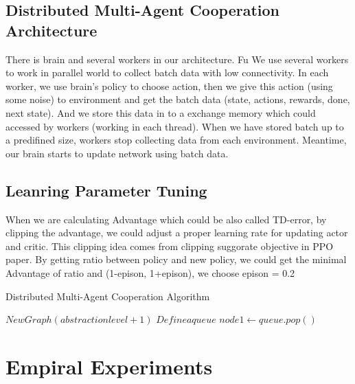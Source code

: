 \documentclass[11pt,twocolumn]{jarticle} %
\begin{document}
\subsection{Distributed Multi-Agent Cooperation Architecture}
There is brain and several workers in our architecture. Fu We use several workers to work in parallel world to collect batch data with low connectivity. In each worker,  we use brain's policy to choose action, then we give this action (using some noise) to environment and get the batch data (state, actions, rewards, done, next state). And we store this data in to a exchange memory which could accessed by workers (working in each thread). When we have stored batch up to a predifined size, workers stop collecting data from each environment. Meantime, our brain starts to update network using batch data.
\subsection{Leanring Parameter Tuning}
When we are calculating Advantage which could be also called TD-error, by clipping the advantage, we could adjust a proper learning rate for updating actor and critic. This clipping idea comes from clipping suggorate objective in PPO paper. By getting ratio between policy and new policy, we could get the minimal Advantage of ratio and (1-epison, 1+epison), we choose epison = 0.2

\begin{algorithm*}
\caption{Distributed Multi-Agent Cooperation Algorithm}
\begin{algorithmic}
\State {}
\State $New Graph (abstraction level+1)$
\State $Define a queue$
\EndFor
{}
    \State $node1 \gets queue.pop()$
    \EndIf
\EndWhile
{}
\end{algorithmic}
\end{algorithm*}

\section{Empiral Experiments}
\end{document}

